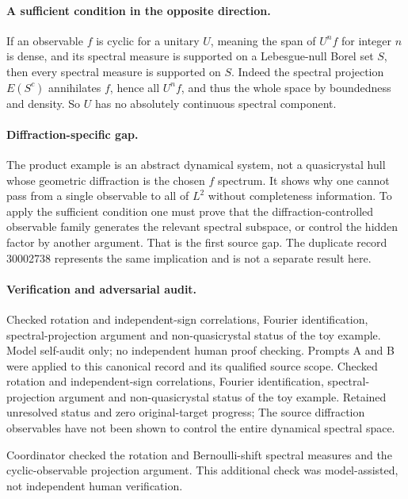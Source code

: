 \documentclass[11pt]{article}
\begin{document}
\paragraph{A sufficient condition in the opposite direction.} If an observable $f$ is cyclic for a unitary $U$, meaning the span of $U^nf$ for integer $n$ is dense, and its spectral measure is supported on a Lebesgue-null Borel set $S$, then every spectral measure is supported on $S$. Indeed the spectral projection $E(S^c)$ annihilates $f$, hence all $U^nf$, and thus the whole space by boundedness and density. So $U$ has no absolutely continuous spectral component.

\paragraph{Diffraction-specific gap.} The product example is an abstract dynamical system, not a quasicrystal hull whose geometric diffraction is the chosen $f$ spectrum. It shows why one cannot pass from a single observable to all of $L^2$ without completeness information. To apply the sufficient condition one must prove that the diffraction-controlled observable family generates the relevant spectral subspace, or control the hidden factor by another argument. That is the first source gap. The duplicate record 30002738 represents the same implication and is not a separate result here.

\paragraph{Verification and adversarial audit.}
Checked rotation and independent-sign correlations, Fourier identification, spectral-projection argument and non-quasicrystal status of the toy example. Model self-audit only; no independent human proof checking. Prompts A and B were applied to this canonical record and its qualified source scope. Checked rotation and independent-sign correlations, Fourier identification, spectral-projection argument and non-quasicrystal status of the toy example. Retained unresolved status and zero original-target progress; The source diffraction observables have not been shown to control the entire dynamical spectral space.

Coordinator checked the rotation and Bernoulli-shift spectral measures and the cyclic-observable projection argument. This additional check was model-assisted, not independent human verification.
\end{document}
